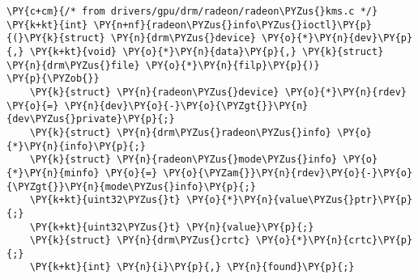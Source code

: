 \begin{Verbatim}[commandchars=\\\{\}]
\PY{c+cm}{/* from drivers/gpu/drm/radeon/radeon\PYZus{}kms.c */}
\PY{k+kt}{int} \PY{n+nf}{radeon\PYZus{}info\PYZus{}ioctl}\PY{p}{(}\PY{k}{struct} \PY{n}{drm\PYZus{}device} \PY{o}{*}\PY{n}{dev}\PY{p}{,} \PY{k+kt}{void} \PY{o}{*}\PY{n}{data}\PY{p}{,} \PY{k}{struct} \PY{n}{drm\PYZus{}file} \PY{o}{*}\PY{n}{filp}\PY{p}{)}
\PY{p}{\PYZob{}}
	\PY{k}{struct} \PY{n}{radeon\PYZus{}device} \PY{o}{*}\PY{n}{rdev} \PY{o}{=} \PY{n}{dev}\PY{o}{-}\PY{o}{\PYZgt{}}\PY{n}{dev\PYZus{}private}\PY{p}{;}
	\PY{k}{struct} \PY{n}{drm\PYZus{}radeon\PYZus{}info} \PY{o}{*}\PY{n}{info}\PY{p}{;}
	\PY{k}{struct} \PY{n}{radeon\PYZus{}mode\PYZus{}info} \PY{o}{*}\PY{n}{minfo} \PY{o}{=} \PY{o}{\PYZam{}}\PY{n}{rdev}\PY{o}{-}\PY{o}{\PYZgt{}}\PY{n}{mode\PYZus{}info}\PY{p}{;}
	\PY{k+kt}{uint32\PYZus{}t} \PY{o}{*}\PY{n}{value\PYZus{}ptr}\PY{p}{;}
	\PY{k+kt}{uint32\PYZus{}t} \PY{n}{value}\PY{p}{;}
	\PY{k}{struct} \PY{n}{drm\PYZus{}crtc} \PY{o}{*}\PY{n}{crtc}\PY{p}{;}
	\PY{k+kt}{int} \PY{n}{i}\PY{p}{,} \PY{n}{found}\PY{p}{;}


\end{Verbatim}
